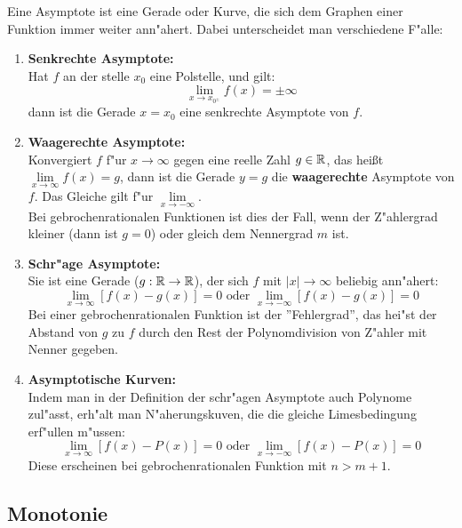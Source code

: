 \documentclass[../MAIN/main.tex]{subfiles}
\begin{document}
Eine Asymptote ist eine Gerade oder Kurve, die sich dem Graphen einer Funktion immer weiter ann"ahert. Dabei unterscheidet man verschiedene F"alle:\\
\begin{Definition}
\begin{enumerate}
	\item \textbf{Senkrechte Asymptote:}\\
	Hat $f$ an der stelle $x_{0}$ eine Polstelle, und gilt:
		$$\lim\limits_{x \rightarrow x_{0^{\pm}}} f(x) = \pm \infty$$
	dann ist die Gerade $x=x_{0}$ eine senkrechte Asymptote von $f$.

	\item \textbf{Waagerechte Asymptote:}\\
	Konvergiert $f$ f"ur $x\rightarrow \infty$ gegen eine reelle Zahl $g\in \mathbb{R}$, das heißt $\lim\limits_{x \rightarrow \infty }{f(x)}=g$, dann ist die Gerade $y=g$ die \textbf{waagerechte} Asymptote von $f$. Das Gleiche gilt f"ur $\lim\limits_{x \rightarrow -\infty}$.\\
	Bei gebrochenrationalen Funktionen ist dies der Fall, wenn der Z"ahlergrad kleiner (dann ist $g=0$) oder gleich dem Nennergrad $m$ ist.

	\item \textbf{Schr"age Asymptote:}\\
	Sie ist eine Gerade ($g:\mathbb{R} \rightarrow \mathbb{R}$), der sich $f$ mit $|x|\rightarrow \infty$ beliebig ann"ahert:
	$$\lim\limits_{x \rightarrow \infty}{[f(x)-g(x)]}=0 \text{ oder } \lim\limits_{x \rightarrow -\infty}{[f(x)-g(x)]}=0$$
	Bei einer gebrochenrationalen Funktion ist der ''Fehlergrad'', das hei"st der Abstand von $g$ zu $f$ durch den Rest der Polynomdivision von Z"ahler mit Nenner gegeben.

	\item \textbf{Asymptotische Kurven:}\\
	Indem man in der Definition der schr"agen Asymptote auch Polynome zul"asst, erh"alt man N"aherungskuven, die die gleiche Limesbedingung erf"ullen m"ussen:
	$$\lim\limits_{x \rightarrow \infty}{[f(x)-P(x)]}=0 \text{ oder } \lim\limits_{x \rightarrow -\infty}{[f(x)-P(x)]}=0$$
	Diese erscheinen bei gebrochenrationalen Funktion mit $n>m+1$.
\end{enumerate}
\end{Definition}

\subsection{Monotonie}
\end{document}
